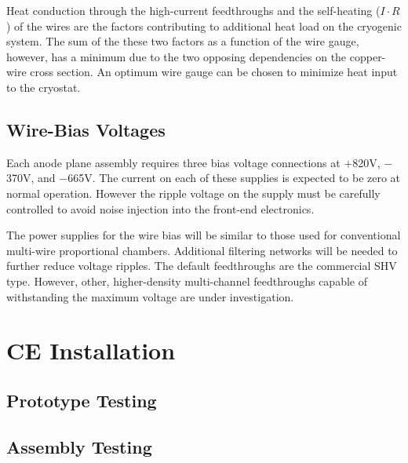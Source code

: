 Heat conduction through the high-current feedthroughs and the self-heating ($I\cdot R$) of the wires are the factors
contributing to additional heat load on the cryogenic system.
The sum of the these two factors as a function of the wire gauge, however, has a minimum 
due to the two opposing dependencies on the copper-wire cross section.
An optimum wire gauge can be chosen to minimize heat input to the cryostat.

%
\subsection{Wire-Bias Voltages}
\label{subsec:ce-feedthrough-wirebias}

Each anode plane assembly requires three bias voltage connections 
at $+$820V, $-$370V, and $-$665V.
The current on each of these supplies is expected to be zero at normal operation.
However the ripple voltage on the supply must be carefully controlled 
to avoid noise injection into the front-end electronics.  

The power supplies for the wire bias will be similar to 
those used for conventional multi-wire proportional chambers. 
Additional filtering networks will 
be needed to further reduce voltage ripples.  
The default feedthroughs are the commercial SHV type.  
However,  other, higher-density multi-channel 
feedthroughs capable of withstanding the maximum voltage are under investigation.  

%
\section{CE Installation}
\label{sec:ce-install}

\subsection{Prototype Testing}
\label{sec:ce-install-proto}

\subsection{Assembly Testing}
\label{sec:ce-install-assembly}

